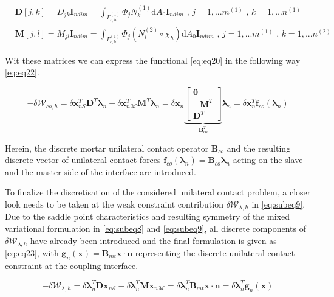 \documentclass[a4paper,10pt]{article} %
\begin{document}
\begin{subequations}\label{eq:eq21}
 \begin{align}
 & \mathbf{D}[j,k] = D_{jk} \mathbf{I}_{ndim} = \int_{\Gamma_{c,h}^{(1)}} \Phi_j N_k^{(1)}\text{d}A_0\mathbf{I}_{ndim}\text{ , } j=1,...m^{(1)}\text{ , } k= 1, ...n^{(1)} \\
 & \mathbf{M}[j,l] = M_{jl} \mathbf{I}_{ndim} = \int_{\Gamma_{c,h}^{(1)}} \Phi_j \left(N_l^{(2)} \circ \chi_h \right)\text{d}A_0\mathbf{I}_{ndim}\text{ , } j=1,...m^{(1)}\text{ , } k= 1, ...n^{(2)}
 \end{align}
\end{subequations}

Wit these matrices we can express the functional \eqref{eq:eq20} in the following way \eqref{eq:eq22}.

\begin{equation}\label{eq:eq22}
 -\delta \mathcal{W}_{co,h} = \delta \mathbf{x}_{n\mathcal{S}}^T\mathbf{D}^T\boldsymbol{\lambda}_n - \delta \mathbf{x}_{n\mathcal{M}}^T\mathbf{M}^T\boldsymbol{\lambda}_n = \delta \mathbf{x}_n \underbrace{\left[\begin{array}{c} \mathbf{0} \\ -\mathbf{M}^T \\ \mathbf{D}^T\end{array} \right]}_{\mathbf{B}^T_{co}} \boldsymbol{\lambda}_n = \delta \mathbf{x}_n^T \mathbf{f}_{co}(\boldsymbol{\lambda}_n)
\end{equation}

Herein, the discrete mortar unilateral contact operator $\mathbf{B}_{co}$ and the resulting discrete vector of unilateral contact forces $\mathbf{f}_{co} (\boldsymbol{\lambda}_n) = \mathbf{B}_{co}\boldsymbol{\lambda}_n$ acting on the slave and the master side of the interface are introduced. 

To finalize the discretisation of the considered unilateral contact problem, a closer look needs to
be taken at the weak constraint contribution $\delta \mathcal{W}_{\lambda,h} $ in \eqref{eq:subeq9}. Due to the saddle point characteristics and resulting symmetry of the mixed variational formulation in \eqref{eq:subeq8}  and \eqref{eq:subeq9}, all discrete components of $\delta \mathcal{W}_{\lambda,h}$ have already been introduced and the final formulation is given as \eqref{eq:eq23}, with $\mathbf{g}_{n}(\mathbf{x}) = \mathbf{B}_{mt} \mathbf{x} \cdot \mathbf{n}$ representing the discrete unilateral contact constraint at the coupling interface.

\begin{equation}\label{eq:eq23}
 -\delta \mathcal{W}_{\lambda,h} = \delta \boldsymbol{\lambda}_n^T\mathbf{D}\mathbf{x}_{n\mathcal{S}} - \delta \boldsymbol{\lambda}_n^T\mathbf{M}\mathbf{x}_{n\mathcal{M}}= \delta \boldsymbol{\lambda}_n^T \mathbf{B}_{mt} \mathbf{x} \cdot \mathbf{n} = \delta \boldsymbol{\lambda}_n^T \mathbf{g}_{n}(\mathbf{x})
\end{equation}
\end{document}
